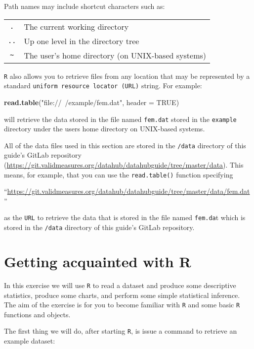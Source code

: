 \documentclass[]{book}
\newenvironment{Shaded}{\begin{snugshade}}{\end{snugshade}}
\newcommand{\KeywordTok}[1]{\textcolor[rgb]{0.13,0.29,0.53}{\textbf{#1}}}
\newcommand{\DataTypeTok}[1]{\textcolor[rgb]{0.13,0.29,0.53}{#1}}
\newcommand{\StringTok}[1]{\textcolor[rgb]{0.31,0.60,0.02}{#1}}
\newcommand{\OtherTok}[1]{\textcolor[rgb]{0.56,0.35,0.01}{#1}}
\newcommand{\NormalTok}[1]{#1}
\theoremstyle{definition}
\theoremstyle{definition}
\theoremstyle{definition}
\theoremstyle{remark}
\begin{document}
Path names may include shortcut characters such as:

\begin{longtable}[]{@{}cl@{}}
\toprule
\texttt{.} & The current working directory\tabularnewline
\texttt{..} & Up one level in the directory tree\tabularnewline
\texttt{\textasciitilde{}} & The user's home directory (on UNIX-based
systems)\tabularnewline
\bottomrule
\end{longtable}

\texttt{R} also allows you to retrieve files from any location that may
be represented by a standard \texttt{uniform\ resource\ locator\ (URL)}
string. For example:

\begin{Shaded}
\begin{Highlighting}[]
\KeywordTok{read.table}\NormalTok{(}\StringTok{"file://~/example/fem.dat"}\NormalTok{, }\DataTypeTok{header =} \OtherTok{TRUE}\NormalTok{)}
\end{Highlighting}
\end{Shaded}

will retrieve the data stored in the file named \texttt{fem.dat} stored
in the \texttt{example} directory under the users home directory on
UNIX-based systems.

All of the data files used in this section are stored in the
\texttt{/data} directory of this guide's GitLab repository
(\url{https://git.validmeasures.org/datahub/datahubguide/tree/master/data}).
This means, for example, that you can use the \texttt{read.table()}
function specifying

``\url{https://git.validmeasures.org/datahub/datahubguide/tree/master/data/fem.dat}''

as the \texttt{URL} to retrieve the data that is stored in the file
named \texttt{fem.da}t which is stored in the \texttt{/data} directory
of this guide's GitLab repository.

\hypertarget{exercise1}{%
\chapter{Getting acquainted with R}\label{exercise1}}

In this exercise we will use \texttt{R} to read a dataset and produce
some descriptive statistics, produce some charts, and perform some
simple statistical inference. The aim of the exercise is for you to
become familiar with \texttt{R} and some basic \texttt{R} functions and
objects.

The first thing we will do, after starting \texttt{R}, is issue a
command to retrieve an example dataset:
\end{document}
